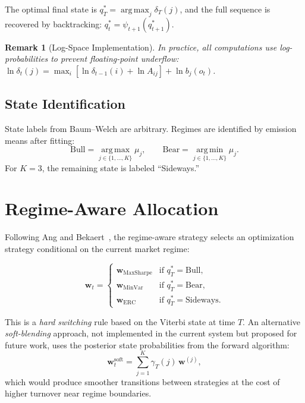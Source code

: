 \documentclass[12pt,a4paper]{article}
\newtheorem{remark}{Remark}[section]
\newcommand{\argmax}{\operatorname*{arg\,max}}
\newcommand{\argmin}{\operatorname*{arg\,min}}
\begin{document}
The optimal final state is $q_T^* = \argmax_j \delta_T(j)$, and the full sequence is recovered by backtracking: $q_t^* = \psi_{t+1}(q_{t+1}^*)$.

\begin{remark}[Log-Space Implementation]
In practice, all computations use log-probabilities to prevent floating-point underflow: $\ln\delta_t(j) = \max_i[\ln\delta_{t-1}(i) + \ln A_{ij}] + \ln b_j(o_t)$.
\end{remark}

\subsection{State Identification}

State labels from Baum--Welch are arbitrary. Regimes are identified by emission means after fitting:
\begin{equation}
    \text{Bull} = \argmax_{j \in \{1,\ldots,K\}} \mu_j, \qquad
    \text{Bear} = \argmin_{j \in \{1,\ldots,K\}} \mu_j.
    \label{eq:state-id}
\end{equation}
For $K = 3$, the remaining state is labeled ``Sideways.''

\section{Regime-Aware Allocation}
\label{sec:regime-alloc}

Following Ang and Bekaert~\cite{ang2004}, the regime-aware strategy selects an optimization strategy conditional on the current market regime:

\begin{equation}
    \bm{w}_t = \begin{cases}
        \bm{w}_{\text{MaxSharpe}} & \text{if } q_T^* = \text{Bull}, \\
        \bm{w}_{\text{MinVar}}    & \text{if } q_T^* = \text{Bear}, \\
        \bm{w}_{\text{ERC}}       & \text{if } q_T^* = \text{Sideways}.
    \end{cases}
    \label{eq:regime-switch}
\end{equation}

This is a \emph{hard switching} rule based on the Viterbi state at time $T$. An alternative \emph{soft-blending} approach, not implemented in the current system but proposed for future work, uses the posterior state probabilities from the forward algorithm:
\begin{equation}
    \bm{w}_t^{\text{soft}} = \sum_{j=1}^{K} \gamma_T(j)\,\bm{w}^{(j)},
    \label{eq:soft-blend}
\end{equation}
which would produce smoother transitions between strategies at the cost of higher turnover near regime boundaries.
\end{document}
